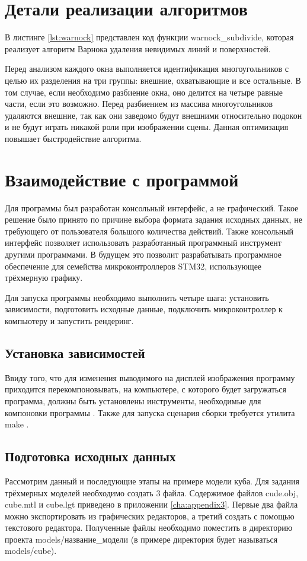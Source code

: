 \section{Детали реализации алгоритмов}
В листинге \ref{lst:warnock} представлен код функции warnock\_subdivide, которая реализует алгоритм Варнока удаления 
невидимых линий и поверхностей.
\newpage


Перед анализом каждого окна выполняется идентификация многоугольников с целью их разделения на три группы: внешние, 
охватывающие и все остальные. В том случае, если необходимо разбиение окна, оно делится на четыре равные части, если это возможно. 
Перед разбиением из массива многоугольников удаляются внешние, так как они заведомо будут внешними относительно подокон и 
не будут играть никакой роли при изображении сцены. Данная оптимизация повышает быстродействие алгоритма.

\section{Взаимодействие с программой}
Для программы был разработан консольный интерфейс, а не графический. Такое решение было принято по причине выбора формата задания 
исходных данных, не требующего от пользователя большого количества действий. Также консольный интерфейс позволяет использовать 
разработанный программный инструмент другими программами. В будущем это позволит разрабатывать программное обеспечение для семейства 
микроконтроллеров STM32, использующее трёхмерную графику.

Для запуска программы необходимо выполнить четыре шага: установить зависимости, подготовить исходные данные, подключить 
микроконтроллер к компьютеру и запустить рендеринг.

\subsection{Установка зависимостей}
Ввиду того, что для изменения выводимого на дисплей изображения программу приходится перекомпоновывать, на компьютере, с которого 
будет загружаться программа, должны быть установлены инструменты, необходимые для компоновки программы \cite{toolchain}. 
Также для запуска сценария сборки требуется утилита make \cite{make}.

\subsection{Подготовка исходных данных}
Рассмотрим данный и последующие этапы на примере модели куба. Для задания трёхмерных моделей необходимо создать 3 файла. 
Содержимое файлов cude.obj, cube.mtl и cube.lgt приведено в приложении \ref{cha:appendix3}. Первые два файла можно экспортировать 
из графических редакторов, а третий создать с помощью текстового редактора. Полученные файлы необходимо поместить в директорию 
проекта models/название\_модели (в примере директория будет называться models/cube).

